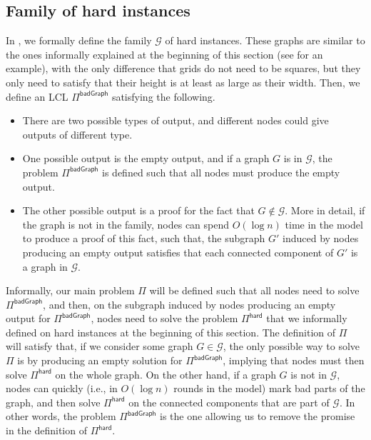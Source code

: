 \documentclass[11pt]{article}
\newcommand{\lbadgraph}{\mathsf {badGraph}}
\newcommand{\lhard}{\mathsf {hard}}
\begin{document}
\subsection{Family of hard instances}

In , we formally define the family $\mathcal{G}$ of hard instances. These graphs are similar to the ones informally explained at the beginning of this section (see  for an example), with the only difference that grids do not need to be squares, but they only need to satisfy that their height is at least as large as their width. Then, we define an LCL $\Pi^{\lbadgraph}$ satisfying the following.
\begin{itemize}
	\item There are two possible types of output, and different nodes could give outputs of different type. 
	\item One possible output is the empty output, and if a graph $G$ is in $\mathcal{G}$, the problem $\Pi^{\lbadgraph}$ is defined such that all nodes must produce the empty output.
	\item The other possible output is a proof for the fact that $G \notin \mathcal{G}$. More in detail,  if the graph is not in the family, nodes can spend $O(\log n)$ time in the \local model to produce a proof of this fact, such that, the subgraph $G'$ induced by nodes producing an empty output satisfies that each connected component of $G'$ is a graph in $\mathcal{G}$.
\end{itemize}
Informally, our main problem $\Pi$ will be defined such that all nodes need to solve $\Pi^{\lbadgraph}$, and then, on the subgraph  induced by nodes producing an empty output for $\Pi^{\lbadgraph}$, nodes need to solve the problem  $\Pi^{\lhard}$ that we informally defined on hard instances at the beginning of this section. The definition of $\Pi$ will satisfy that, if we consider some graph $G \in \mathcal{G}$, the only possible way to solve $\Pi$ is by producing an empty solution for $\Pi^{\lbadgraph}$, implying that nodes must then solve  $\Pi^{\lhard}$ on the whole graph. On the other hand, if a graph $G$ is not in $\mathcal{G}$, nodes can quickly (i.e., in $O(\log n)$ rounds in the \local model) mark bad parts of the graph, and then solve $\Pi^{\lhard}$ on the connected components that are part of $\mathcal{G}$.
In other words, the problem $\Pi^{\lbadgraph}$ is the one allowing us to remove the promise in the definition of $\Pi^{\lhard}$.
\end{document}
